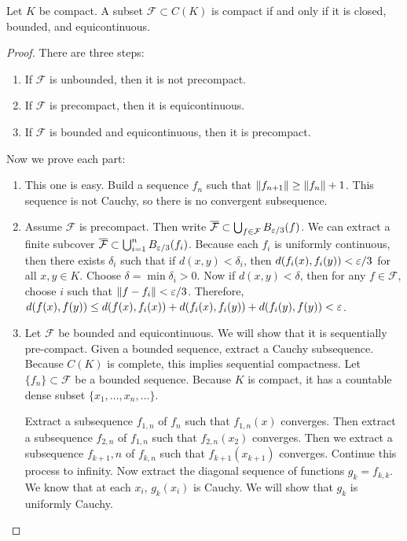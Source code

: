 \documentclass[10pt, twoside]{article}
\begin{document}
    \begin{thm}
        Let $K$ be compact. A subset $\mathcal{F} \subset C(K)$ is compact if and only if it is closed, bounded, and equicontinuous.
        \begin{proof}
            There are three steps:
            \begin{enumerate}
                \item If $\mathcal{F}$ is unbounded, then it is not precompact.
                \item If $\mathcal{F}$ is precompact, then it is equicontinuous.
                \item If $\mathcal{F}$ is bounded and equicontinuous, then it is precompact.
            \end{enumerate}
            Now we prove each part:
            \begin{enumerate}
                \item This one is easy. Build a sequence $f_n$ such that $\lVert f_{n+1}\rVert \geq \lVert f_n\rVert + 1$. This sequence is not Cauchy, so there is no convergent subsequence.
                \item Assume $\mathcal{F}$ is precompact. Then write $\overline{\mathcal{F}} \subset \bigcup_{f \in \mathcal{F}} B_{\varepsilon/3}(f)$. We can extract a finite subcover $\overline{\mathcal{F}} \subset \bigcup_{i=1}^n B_{\varepsilon/3}(f_i)$. Because each $f_i$ is uniformly continuous, then there exists $\delta_i$ such that if $d(x,y) < \delta_i$, then $d(f_i(x), f_i(y)) < \varepsilon/3$ for all $x,y \in K$. Choose $\delta = \min \delta_i > 0$. Now if $d(x,y) < \delta$, then for any $f \in \mathcal{F}$, choose $i$ such that $\lVert f-f_i\rVert < \varepsilon/3$. Therefore, $d(f(x), f(y)) \leq d(f(x), f_i(x)) + d(f_i(x), f_i(y)) + d(f_i(y), f(y)) < \varepsilon$.
                \item Let $\mathcal{F}$ be bounded and equicontinuous. We will show that it is sequentially pre-compact. Given a bounded sequence, extract a Cauchy subsequence. Because $C(K)$ is complete, this implies sequential compactness. Let $\{f_n\} \subset \mathcal{F}$ be a bounded sequence. Because $K$ is compact, it has a countable dense subset $\{x_1, \ldots, x_n, \ldots\}$.
                
                Extract a subsequence $f_{1,n}$ of $f_n$ such that $f_{1,n}(x)$ converges. Then extract a subsequence $f_{2,n}$ of $f_{1,n}$ such that $f_{2,n}(x_2)$ converges. Then we extract a subsequence $f_{k+1}, n$ of $f_{k,n}$ such that $f_{k+1}(x_{k+1})$ converges. Continue this process to infinity. Now extract the diagonal sequence of functions $g_k = f_{k,k}$. We know that at each $x_i$, $g_k(x_i)$ is Cauchy. We will show that $g_k$ is uniformly Cauchy.


\end{enumerate}
\end{proof}
\end{thm}
\end{document}
